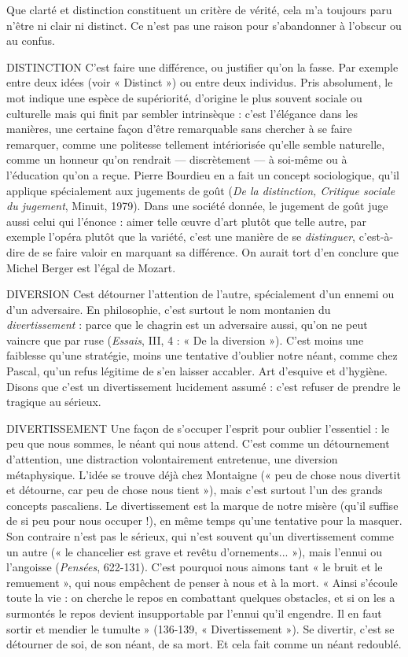 Que clarté et distinction constituent un critère de vérité, cela m’a toujours
paru n'être ni clair ni distinct. Ce n’est pas une raison pour s’abandonner à
l’obscur ou au confus.

DISTINCTION C'est faire une différence, ou justifier qu’on la fasse. Par
exemple entre deux idées (voir « Distinct ») ou entre deux
individus. Pris absolument, le mot indique une espèce de supériorité, d’origine
le plus souvent sociale ou culturelle mais qui finit par sembler intrinsèque :
c’est l'élégance dans les manières, une certaine façon d’être remarquable sans
chercher à se faire remarquer, comme une politesse tellement intériorisée
qu’elle semble naturelle, comme un honneur qu’on rendrait — discrètement — à
soi-même ou à l’éducation qu’on a reçue. Pierre Bourdieu en a fait un concept
sociologique, qu’il applique spécialement aux jugements de goût ({\it De la distinction,
Critique sociale du jugement}, Minuit, 1979). Dans une société donnée, le
jugement de goût juge aussi celui qui l’énonce : aimer telle œuvre d’art plutôt
que telle autre, par exemple l’opéra plutôt que la variété, c’est une manière de
se {\it distinguer}, c’est-à-dire de se faire valoir en marquant sa différence. On aurait
tort d’en conclure que Michel Berger est l’égal de Mozart.

DIVERSION Cest détourner l'attention de l’autre, spécialement d’un
ennemi ou d’un adversaire. En philosophie, c’est surtout le
nom montanien du {\it divertissement} : parce que le chagrin est un adversaire aussi,
qu'on ne peut vaincre que par ruse ({\it Essais}, III, 4 : « De la diversion »). C’est
moins une faiblesse qu’une stratégie, moins une tentative d’oublier notre néant,
comme chez Pascal, qu’un refus légitime de s’en laisser accabler. Art d’esquive
et d'hygiène. Disons que c’est un divertissement lucidement assumé : c’est
refuser de prendre le tragique au sérieux.

DIVERTISSEMENT Une façon de s’occuper l'esprit pour oublier l’essentiel :
le peu que nous sommes, le néant qui nous
attend. C’est comme un détournement d’attention, une distraction volontairement
entretenue, une diversion métaphysique. L’idée se trouve déjà chez Montaigne
(« peu de chose nous divertit et détourne, car peu de chose nous tient »),
mais c’est surtout l’un des grands concepts pascaliens. Le divertissement est la
marque de notre misère (qu’il suffise de si peu pour nous occuper !), en même
temps qu’une tentative pour la masquer. Son contraire n’est pas le sérieux, qui
n’est souvent qu’un divertissement comme un autre (« le chancelier est grave et
revêtu d’ornements... »), mais l’ennui ou l’angoisse ({\it Pensées}, 622-131). C’est
pourquoi nous aimons tant « le bruit et le remuement », qui nous empêchent
de penser à nous et à la mort. « Ainsi s’écoule toute la vie : on cherche le repos
en combattant quelques obstacles, et si on les a surmontés le repos devient
insupportable par l'ennui qu’il engendre. Il en faut sortir et mendier le
tumulte » (136-139, « Divertissement »). Se divertir, c’est se détourner de soi,
de son néant, de sa mort. Et cela fait comme un néant redoublé.

